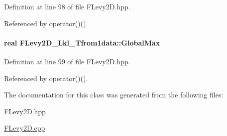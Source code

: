 \-Definition at line 98 of file \-F\-Levy2\-D.\-hpp.



\-Referenced by operator()().

\hypertarget{classFLevy2D__Lkl__Tfrom1data_a76c6284c5bb945dcbdd9e0b4e93b7159}{
\paragraph[{\-Global\-Max}]{\setlength{\rightskip}{0pt plus 5cm}real {\bf \-F\-Levy2\-D\-\_\-\-Lkl\-\_\-\-Tfrom1data\-::\-Global\-Max}}}\label{classFLevy2D__Lkl__Tfrom1data_a76c6284c5bb945dcbdd9e0b4e93b7159}


\-Definition at line 99 of file \-F\-Levy2\-D.\-hpp.



\-Referenced by operator()().



\-The documentation for this class was generated from the following files\-:\begin{DoxyCompactItemize}
\item 
\hyperlink{FLevy2D_8hpp}{\-F\-Levy2\-D.\-hpp}\item 
\hyperlink{FLevy2D_8cpp}{\-F\-Levy2\-D.\-cpp}\end{DoxyCompactItemize}
